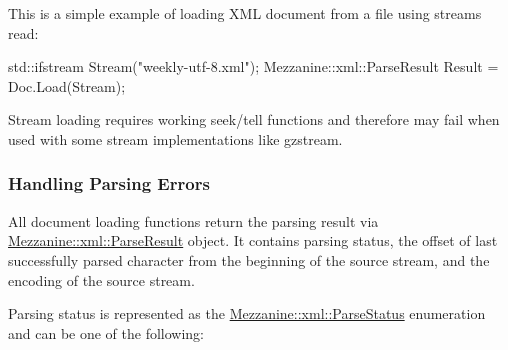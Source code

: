  \par
 This is a simple example of loading XML document from a file using streams read: 
\begin{DoxyCode}
 std::ifstream Stream("weekly-utf-8.xml");
 Mezzanine::xml::ParseResult Result = Doc.Load(Stream);
\end{DoxyCode}
 Stream loading requires working seek/tell functions and therefore may fail when used with some stream implementations like gzstream. \par
 \par
 \hypertarget{XMLManual_XMLLoadingErrors}{}\subsubsection{Handling Parsing Errors}\label{XMLManual_XMLLoadingErrors}
All document loading functions return the parsing result via \hyperlink{structMezzanine_1_1xml_1_1ParseResult}{Mezzanine::xml::ParseResult} object. It contains parsing status, the offset of last successfully parsed character from the beginning of the source stream, and the encoding of the source stream. \par
 \par
 Parsing status is represented as the \hyperlink{namespaceMezzanine_1_1xml_a119489767bc2293563aef2066d960796}{Mezzanine::xml::ParseStatus} enumeration and can be one of the following:
